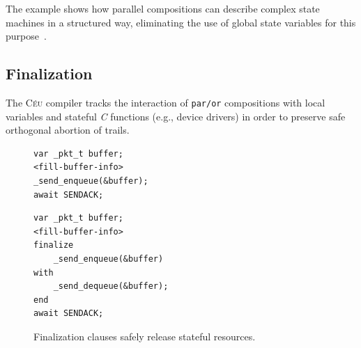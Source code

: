 \documentclass{sigplanconf}
\newcommand{\CEU}{\textsc{C\'{e}u}\xspace}
\newcommand{\code}[1] {{\small{\texttt{#1}}}}
\newcommand{\1}{\;}
\newcommand{\2}{\;\;}
\newcommand{\3}{\;\;\;}
\newcommand{\5}{\;\;\;\;\;}
\begin{document}
The example shows how parallel compositions can describe complex state machines 
in a structured way, eliminating the use of global state variables for this 
purpose~\cite{ceu.sensys13}.

\subsection{Finalization}
\label{sec.ceu.fin}

%
The \CEU compiler tracks the interaction of \code{par/or} compositions with 
local variables and stateful \emph{C} functions (e.g., device drivers) in order 
to preserve safe orthogonal abortion of trails.
%

\begin{figure}%
\begin{minipage}[t]{0.45\linewidth}
\begin{lstlisting}
var _pkt_t buffer;
<fill-buffer-info>
_send_enqueue(&buffer);
await SENDACK;
\end{lstlisting}
\end{minipage}
%
\begin{minipage}[t]{0.50\linewidth}
\begin{lstlisting}
var _pkt_t buffer;
<fill-buffer-info>
finalize
    _send_enqueue(&buffer)
with
    _send_dequeue(&buffer);
end
await SENDACK;
\end{lstlisting}
\end{minipage}
\caption{ Finalization clauses safely release stateful resources.
\label{lst.fin}
}
\end{figure}
\end{document}
